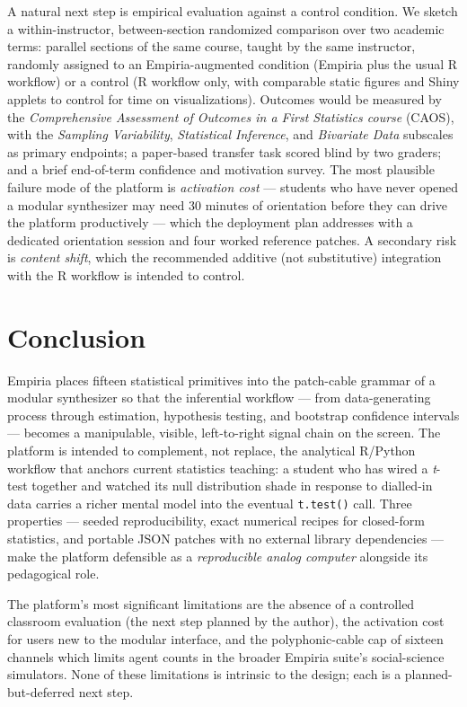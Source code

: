 A natural next step is empirical evaluation against a control
condition. We sketch a within-instructor, between-section randomized
comparison over two academic terms: parallel sections of the same
course, taught by the same instructor, randomly assigned to an
Empiria-augmented condition (Empiria plus the usual R workflow) or
a control (R workflow only, with comparable static figures and
Shiny applets to control for time on visualizations). Outcomes
would be measured by the \emph{Comprehensive Assessment of Outcomes
in a First Statistics course} (CAOS), with the \emph{Sampling
Variability}, \emph{Statistical Inference}, and \emph{Bivariate
Data} subscales as primary endpoints; a paper-based transfer task
scored blind by two graders; and a brief end-of-term confidence and
motivation survey. The most plausible failure mode of the platform
is \emph{activation cost} --- students who have never opened a
modular synthesizer may need 30 minutes of orientation before they
can drive the platform productively --- which the deployment plan
addresses with a dedicated orientation session and four worked
reference patches. A secondary risk is \emph{content shift}, which
the recommended additive (not substitutive) integration with the R
workflow is intended to control.

\section{Conclusion}\label{conclusion}

Empiria places fifteen statistical primitives into the
patch-cable grammar of a modular synthesizer so that the
inferential workflow --- from data-generating process through
estimation, hypothesis testing, and bootstrap confidence intervals
--- becomes a manipulable, visible, left-to-right signal chain on
the screen. The platform is intended to complement, not replace,
the analytical R/Python workflow that anchors current statistics
teaching: a student who has wired a \emph{t}-test together and
watched its null distribution shade in response to dialled-in data
carries a richer mental model into the eventual \texttt{t.test()}
call. Three properties --- seeded reproducibility, exact numerical
recipes for closed-form statistics, and portable JSON patches with
no external library dependencies --- make the platform defensible
as a \emph{reproducible analog computer} alongside its pedagogical
role.

The platform's most significant limitations are the absence of a
controlled classroom evaluation (the next step planned by the
author), the activation cost for users new to the modular interface,
and the polyphonic-cable cap of sixteen channels which limits agent
counts in the broader Empiria suite's social-science simulators.
None of these limitations is intrinsic to the design; each is a
planned-but-deferred next step.

